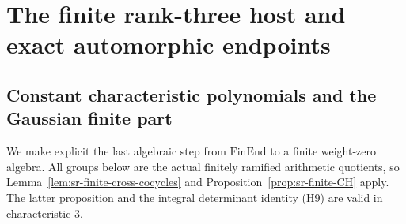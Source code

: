 \section{The finite rank-three host and exact automorphic endpoints}
\label{sec:sr-rank-three-host-endpoints}

\subsection{Constant characteristic polynomials and the Gaussian finite part}
\label{subsec:sr-constant-character-finite-part}
We make explicit the last algebraic step from
\(\mathrm{FinEnd}\) to a finite weight-zero algebra.
All groups below are the actual finitely ramified arithmetic
quotients, so Lemma~\ref{lem:sr-finite-cross-cocycles}
and Proposition~\ref{prop:sr-finite-CH} apply.
The latter proposition and the integral determinant identity
(H9) are valid in characteristic \(3\).

